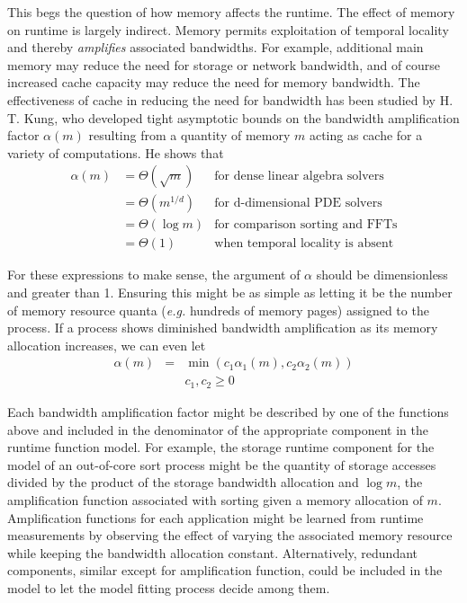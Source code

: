 This begs the question of how memory affects the runtime.
The effect of memory on runtime is largely indirect.
Memory permits exploitation of temporal locality and thereby \emph{amplifies} associated bandwidths.
For example, additional main memory may reduce the need for storage or network bandwidth,
and of course increased cache capacity may reduce the need for memory bandwidth.
The effectiveness of cache in reducing the need for bandwidth has been studied by
H. T. Kung\cite{Ku}, who developed tight asymptotic bounds on the bandwidth amplification
factor $\alpha(m)$ resulting from a quantity of memory $m$ acting as cache for a variety of computations.
He shows that
\begin{displaymath}
\begin{array}{lll}
\alpha(m) &= \Theta(\sqrt m) & \mbox{for dense linear algebra solvers} \\
          &= \Theta(m^{1/d}) & \mbox{for d-dimensional PDE solvers} \\
          &= \Theta(\log m)  & \mbox{for comparison sorting and FFTs} \\
          &= \Theta(1)       & \mbox{when temporal locality is absent}
\end{array}
\end{displaymath}

For these expressions to make sense, the argument of $\alpha$ should be dimensionless and greater than 1.
Ensuring this might be as simple as letting it be the number of memory resource quanta
(\emph{e.g.} hundreds of memory pages) assigned to the process.
If a process shows diminished bandwidth amplification as its memory allocation increases, we can even let
\begin{eqnarray*}
\alpha(m) &=& \min(c_1\alpha_1(m),c_2\alpha_2(m)) \\
          & &c_1,c_2 \geq 0
\end{eqnarray*}

Each bandwidth amplification factor might be described by one of the functions above
and included in the denominator of the appropriate component in the runtime function model.
For example, the storage runtime component for the model of an out-of-core sort process might be
the quantity of storage accesses divided by the product of the storage bandwidth allocation and $\log m$,
the amplification function associated with sorting given a memory allocation of $m$.
Amplification functions for each application might be learned from runtime measurements
by observing the effect of varying the associated memory resource while keeping the bandwidth allocation constant.
Alternatively, redundant components, similar except for amplification function, could be included in the model
to let the model fitting process decide among them.

